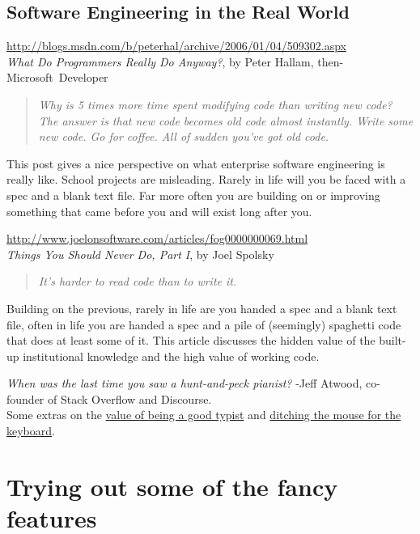 \documentclass{article}
\begin{document}
{\subsection*{Software Engineering in the Real World}
\url{http://blogs.msdn.com/b/peterhal/archive/2006/01/04/509302.aspx}\\
\emph{What Do Programmers Really Do Anyway?}, by Peter Hallam, then-Microsoft~Developer
\begin{quote}
  \emph{%
    Why is 5 times more time spent modifying code than writing new code? The
    answer is that new code becomes old code almost instantly.  Write some new
    code. Go for coffee. All of sudden you've got old code.
  }
\end{quote}
This post gives a nice perspective on what enterprise software engineering is
really like. School projects are misleading. Rarely in life will you be faced
with a spec and a blank text file. Far more often you are building on or
improving something that came before you and will exist long after you.

\medskip
\noindent
\url{http://www.joelonsoftware.com/articles/fog0000000069.html}\\
\emph{Things You Should Never Do, Part I}, by Joel Spolsky
\begin{quote}
  \emph{It's harder to read code than to write it.}
\end{quote}
Building on the previous, rarely in life are you handed a spec and a blank text
file, often in life you are handed a spec and a pile of (seemingly) spaghetti
code that does at least some of it. This article discusses the hidden value of
the built-up institutional knowledge and the high value of working code.

\medskip
\noindent
\emph{When was the last time you saw a hunt-and-peck pianist?} -Jeff Atwood,
co-founder of Stack Overflow and Discourse.\\
Some extras on the
\href{http://blog.codinghorror.com/we-are-typists-first-programmers-second/}
{value of being a good typist}
and
\href{http://blog.codinghorror.com/going-commando-put-down-the-mouse/}
{ditching the mouse for the keyboard}.

}



\newpage
\section{Trying out some of the fancy features}
\end{document}
